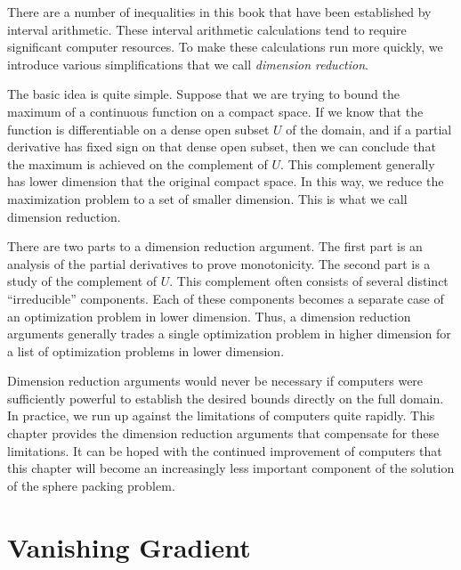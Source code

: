 
\label{chap:reduction}

There are a number of inequalities in this book that have been
established by interval arithmetic.  These interval arithmetic
calculations tend to require significant computer resources.  To
make these calculations run more quickly, we introduce various
simplifications that we call {\it dimension reduction}.

The basic idea is quite simple.  Suppose that we are trying to
bound the maximum of a continuous function on a compact space.  If
we know that the function is differentiable on a dense open subset
$U$ of the domain, and if a partial derivative has fixed sign on
that dense open subset, then we can conclude that the maximum is
achieved on the complement of $U$.   This complement generally has
lower dimension that the original compact space.  In this way, we
reduce the maximization problem to a set of smaller dimension.
This is what we call dimension reduction.

There are two parts to a dimension reduction argument.  The first
part is an analysis of the partial derivatives to prove
monotonicity.  The second part is a study of the complement of
$U$.  This complement often consists of several distinct
``irreducible'' components.  Each of these components becomes a
separate case of an optimization problem in lower dimension. Thus,
a dimension reduction arguments generally trades a single
optimization problem in higher dimension for a list of
optimization problems in lower dimension.

Dimension reduction arguments would never be necessary if
computers were sufficiently powerful to establish the desired
bounds directly on the full domain.  In practice, we run up
against the limitations of computers quite rapidly.  This chapter
provides the dimension reduction arguments that compensate for
these limitations.  It can be hoped with the continued improvement
of computers that this chapter will become an increasingly less
important component of the solution of the sphere packing problem.


\section{Vanishing Gradient}\label{sec:gradient}

